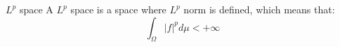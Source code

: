 \documentclass{article}
\begin{document}
\begin{theorem}{$L^p$ space}
    A $L^p$ space is a space where $L^p$ norm is defined, which means that:
\begin{equation}
    \int_\Omega |f|^p d\mu<+\infty
\end{equation}
\end{theorem}
\end{document}

